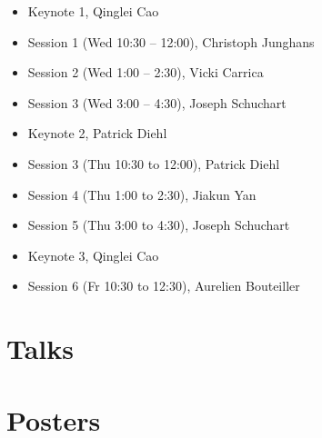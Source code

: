 \documentclass[12pt,letterpaper]{book}
\newenvironment{conf-abstract}[4][]{
 \needspace{10\baselineskip}
 \begin{center}
 { \renewcommand\textsuperscript[1]{}
 \phantomsection\addcontentsline{toc}{section}
 {\texorpdfstring{#2 (\emph{#3})}{#2 (#3)}}
 }
 {{\large\bfseries #2}\marginnote{#1}\par}
 \medskip
 {#3\par}
 \smallskip
 {\small #4\par}
 \end{center}
}{%
 \bigskip
 \hrule
 \bigskip
}
\newcommand{\indexauthors}[1]{%
 \forcsvlist{\index}{#1}
}
\begin{document}
\begin{itemize}
\item Keynote 1, Qinglei Cao 
\item Session 1 (Wed 10:30 -- 12:00), Christoph Junghans 
\item Session 2 (Wed 1:00 -- 2:30), Vicki Carrica
\item Session 3 (Wed 3:00 -- 4:30), Joseph Schuchart
\item Keynote 2, Patrick Diehl
\item Session 3 (Thu 10:30 to 12:00), Patrick Diehl
\item Session 4 (Thu 1:00 to 2:30), Jiakun Yan
\item Session 5 (Thu 3:00 to 4:30), Joseph Schuchart 
\item Keynote 3, Qinglei Cao
\item Session 6 (Fr 10:30 to 12:30), Aurelien Bouteiller
\end{itemize}

\chapter{Talks}

{
\begin{conf-abstract}[\datum\\\tiny\time]
{\title}
{\first~ \last}
{\affiliation}
\indexauthors{\last~\first}

\newpage
\end{conf-abstract}
}

\chapter{Posters}

{
\def\x{\last}
\def\y{\substring{\x}{1}{1}\par}
\begin{conf-abstract}[\datum\\\time]
{\title}
{\first~\last}
{\affiliation}
\indexauthors{\last~\first}
\begin{center}

\end{center}
\end{conf-abstract}
}


%
\end{document}
